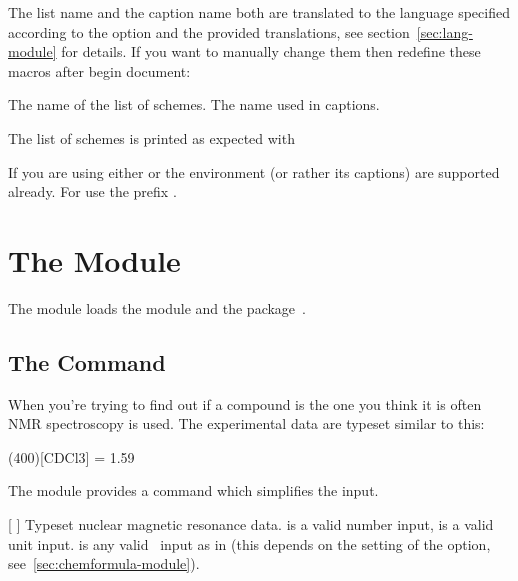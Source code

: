 \documentclass{chemmacros-manual}
\begin{document}
The list name and the caption name both are translated to the language
specified according to the  option and the provided translations,
see section~\vref{sec:lang-module} for details. If you want to manually change
them then redefine these macros after begin document:
\begin{commands}
    The name of the list of schemes.
    The name used in captions.
\end{commands}
The list of schemes is printed as expected with
\begin{commands}
\end{commands}

If you are using either  or  the
 environment (or rather its captions) are supported already.  For
 use the prefix .

\section{The  Module}\label{sec:spectroscopy-module}

The  module loads the  module
and the  package~\cite{pkg:siunitx}.

\subsection{The  Command}

When you're trying to find out if a compound is the one you think it is often
NMR spectroscopy is used.  The experimental data are typeset similar to this:
\begin{center}
  \NMR(400)[CDCl3] = \num{1.59}
\end{center}
The  module provides a command which simplifies the
input.

\begin{commands}
  [\sarg{}%
    ]
    Typeset nuclear magnetic resonance data.  is a valid
     number input,  is a valid  unit
    input.   is any valid \chemformula\ input as in 
    (this depends on the setting of the  option,
    see~\vref{sec:chemformula-module}).
\end{commands}
\end{document}
